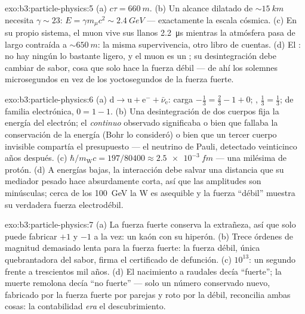 \begin{solution}{exo:b3:particle-physics:5}
(a) $c\tau = \qty{660}{m}$. (b) Un alcance dilatado de
${\sim}\qty{15}{km}$ necesita $\gamma \sim 23$: $E = \gamma
m_\mu c^2 \sim \qty{2.4}{GeV}$ --- exactamente la escala cósmica. (c)
En su propio sistema, el muon vive sus llanos \qty{2.2}{\micro s}
mientras la atmósfera pasa de largo contraída a
${\sim}\qty{650}{m}$: la misma supervivencia, otro libro de cuentas. (d) El : no hay ningún  lo bastante ligero, y el muon es un
; su desintegración debe cambiar de sabor, cosa que solo hace la fuerza
débil --- de ahí los solemnes microsegundos en vez de los
yoctosegundos de la fuerza fuerte.
\end{solution}

\begin{solution}{exo:b3:particle-physics:6}
(a) $\text{d} \to \text{u} + \text{e}^- + \bar\nu_{\text{e}}$:
carga $-\tfrac13 = \tfrac23 - 1 + 0$; ,
$\tfrac13 = \tfrac13$;  de familia electrónica, $0 = 1 - 1$. (b) Una
desintegración de dos cuerpos fija la energía del electrón; el \emph{continuo}
observado significaba o bien que fallaba la conservación de la energía
(Bohr lo consideró) o bien que un tercer cuerpo invisible compartía el
presupuesto --- el neutrino de Pauli, detectado veinticinco años después.
(c) $\hbar/m_{\text{W}}c = 197/80400 \approx
\qty{2.5e-3}{fm}$ --- una milésima de protón. (d) A energías
bajas, la interacción debe salvar una distancia que su mediador pesado
hace absurdamente corta, así que las amplitudes son minúsculas; cerca de los
\qty{100}{GeV} la W es asequible y la fuerza ``débil'' muestra
su verdadera fuerza electrodébil.
\end{solution}

\begin{solution}{exo:b3:particle-physics:7}
(a) La fuerza fuerte conserva la extrañeza, así que solo puede fabricar
$+1$ y $-1$ a la vez: un kaón con su hiperón. (b) Trece
órdenes de magnitud demasiado lenta para la fuerza fuerte: la fuerza
débil, única quebrantadora del sabor, firma el certificado de defunción.
(c) $10^{13}$: un segundo frente a trescientos mil años.
(d) El nacimiento a raudales decía ``fuerte''; la muerte remolona decía ``no
fuerte'' --- solo un número conservado nuevo, fabricado por la fuerza
fuerte por parejas y roto por la débil, reconcilia ambas cosas: la
contabilidad \emph{era} el descubrimiento.
\end{solution}

